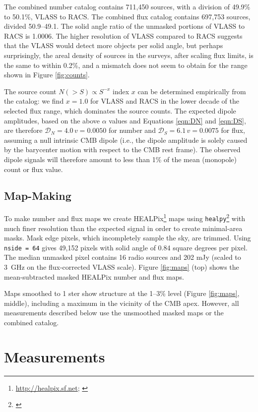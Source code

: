 \documentclass[twocolumn]{aastex63}
\begin{document}
The combined number catalog contains 711,450 sources, with a division of 49.9\% to 50.1\%, VLASS to RACS.  The
combined flux catalog contains 697,753 sources, divided 50.9--49.1.  The solid angle ratio of the unmasked portions
of VLASS to RACS is 1.0006.
The higher resolution of VLASS compared to RACS suggests that the VLASS would detect more objects per
solid angle, but perhaps surprisingly, the areal density of sources in the surveys, after scaling
flux limits, is the same to within 0.2\%, and a mismatch does not seem to obtain for the range shown in Figure \ref{fig:counts}.

The source count $N(>S) \propto S^{-x}$ index $x$ can be determined empirically from the
catalog: we find $x=1.0$ for VLASS and RACS in the lower decade of the selected
flux range, which dominates the source counts.  The expected dipole amplitudes,
based on the above $\alpha$ values and Equations \ref{eqn:DN} and \ref{eqn:DS}, are therefore 
$\mathcal{D}_N = 4.0\, v = 0.0050$ for number and $\mathcal{D}_S = 6.1\, v = 0.0075$ for flux,
assuming a null intrinsic CMB dipole (i.e., the dipole amplitude is solely caused by the barycenter motion with
respect to the CMB rest frame). The observed dipole signals will therefore amount to less than 1\% of the mean (monopole) count or flux value.



\subsection{Map-Making}

To make number and flux maps we create HEALPix\footnote{\url{http://healpix.sf.net}; \citet{healpix2005}}
maps using \texttt{healpy}\footnote{\citet{healpy2019}} with much finer resolution than the expected signal in order to create minimal-area masks.  Mask edge pixels, which incompletely sample the sky, are trimmed.  
Using \texttt{nside = 64} gives 49,152 pixels with solid angle of 0.84 square degrees per pixel.
The median unmasked pixel contains 16 radio sources and 202 mJy (scaled to 3~GHz on the flux-corrected VLASS scale).
Figure \ref{fig:maps} (top) shows the mean-subtracted masked HEALPix number and flux maps.  

Maps smoothed to 1 ster show structure at the 1--3\% level (Figure \ref{fig:maps}, middle), including a
maximum in the vicinity of the CMB apex.  However, all measurements described below use the unsmoothed masked maps
or the combined catalog.


\section{\label{sec:meas} Measurements}
\end{document}
